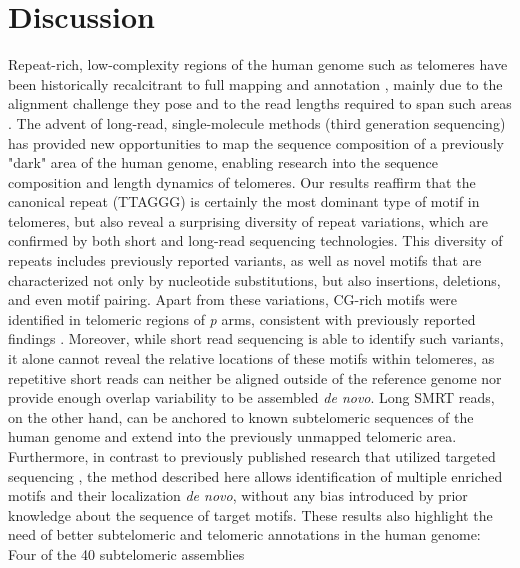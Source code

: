 \documentclass{article}
\begin{document}
\section*{Discussion}  \label{sec:discussion}
    Repeat-rich, low-complexity regions of the human genome such as telomeres
        have been historically recalcitrant to full mapping and annotation \parencite{miga2015},
        mainly due to the alignment challenge they pose and to the read lengths required to span such areas \parencite{ngslowcomplexity}.
    The advent of long-read, single-molecule methods (third generation sequencing)
        has provided new opportunities to map the sequence composition of a previously "dark" area of the human genome,
        enabling research into the sequence composition and length dynamics \parencite{luxton2020} of telomeres.
    Our results reaffirm
        that the canonical repeat (TTAGGG) is certainly the most dominant type of motif in telomeres,
        but also reveal a surprising diversity of repeat variations,
            which are confirmed by both short and long-read sequencing technologies.
    This diversity of repeats includes previously reported variants,
        as well as novel motifs that are characterized not only by nucleotide substitutions,
        but also insertions, deletions, and even motif pairing.
    Apart from these variations,
        CG-rich motifs were identified in telomeric regions of \textit{p} arms,
        consistent with previously reported findings \parencite{cpg}.
    Moreover, while short read sequencing is able to identify such variants,
        it alone cannot reveal the relative locations of these motifs within telomeres,
        as repetitive short reads can
            neither be aligned outside of the reference genome
            nor provide enough overlap variability to be assembled \textit{de novo}.
    Long SMRT reads, on the other hand,
        can be anchored to known subtelomeric sequences of the human genome and extend into the previously unmapped telomeric area.
    Furthermore, in contrast to previously published research that utilized targeted sequencing
        \parencite{telovars1989,telovars1999,telovars2018,telovars2019},
        the method described here allows identification of multiple enriched motifs and their localization
            \textit{de novo}, without any bias introduced by prior knowledge about the sequence of target motifs.
    These results also highlight the need of better subtelomeric and telomeric annotations in the human genome:
    Four of the 40 subtelomeric assemblies \parencite{riethman2014}
\end{document}
